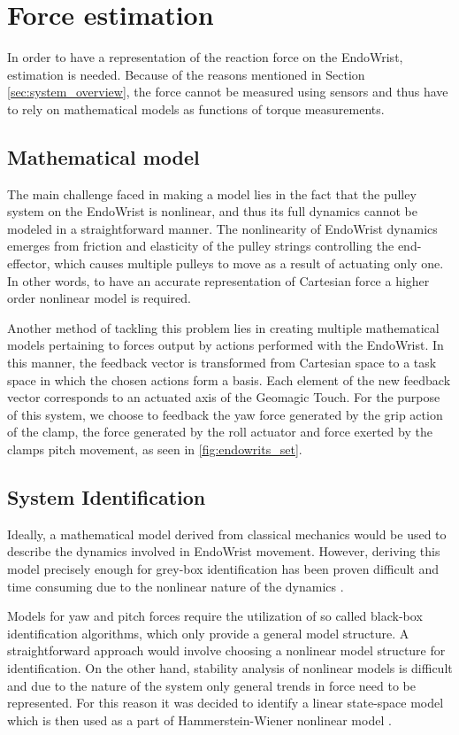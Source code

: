 \section{Force estimation}\label{sec:force_estimation}
In order to have a representation of the reaction force on the EndoWrist, estimation is needed.
Because of the reasons mentioned in Section \ref{sec:system_overview}, the force cannot be measured using sensors and thus have to rely on mathematical models as functions of torque measurements.

\subsection{Mathematical model}
The main challenge faced in making a model lies in the fact that the pulley system on the EndoWrist is nonlinear, and thus its full dynamics cannot be modeled in a straightforward manner. 
The nonlinearity of EndoWrist dynamics emerges from friction and elasticity of the pulley strings controlling the end-effector, which causes multiple pulleys to move as a result of actuating only one. 
In other words, to have an accurate representation of Cartesian force a higher order nonlinear model is required.

Another method of tackling this problem lies in creating multiple mathematical models pertaining to forces output by actions performed with the EndoWrist.
In this manner, the feedback vector is transformed from Cartesian space to a task space in which the chosen actions form a basis.
Each element of the new feedback vector corresponds to an actuated axis of the Geomagic Touch.
For the purpose of this system, we choose to feedback the yaw force generated by the grip action of the clamp, the force generated by the roll actuator and force exerted by the clamps pitch movement, as seen in \ref{fig:endowrits_set}.

\subsection{System Identification}
Ideally, a mathematical model derived from classical mechanics would be used to describe the dynamics involved in EndoWrist movement.
However, deriving this model precisely enough for grey-box identification has been proven difficult and time consuming due to the nonlinear nature of the dynamics \cite{kim2014dynamic}.

Models for yaw and pitch forces require the utilization of so called black-box identification algorithms, which only provide a general model structure. 
A straightforward approach would involve choosing a nonlinear model structure for identification.
On the other hand, stability analysis of nonlinear models is difficult and due to the nature of the system only general trends in force need to be represented.
For this reason it was decided to identify a linear state-space model which is then used as a part of Hammerstein-Wiener nonlinear model \cite{zhu2002estimation}.

